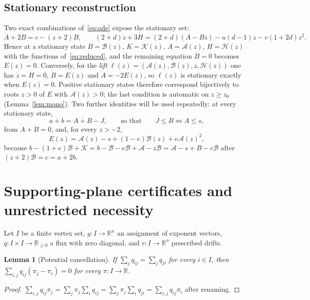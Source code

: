 \documentclass[11pt,a4paper]{article}
\theoremstyle{plain}
\newtheorem{lemma}[theorem]{Lemma}
\theoremstyle{definition}
\theoremstyle{remark}
\newcommand{\R}{\mathbb{R}}
\newcommand{\rA}{\mathcal{A}}
\newcommand{\rB}{\mathcal{B}}
\newcommand{\rK}{\mathcal{K}}
\newcommand{\rH}{\mathcal{H}}
\begin{document}
\subsection{Stationary reconstruction}

Two exact combinations of~\eqref{eq:ode} expose the stationary set:
\begin{equation}\label{eq:combinations}
\dot A+2\dot B=c-(z+2)B,\qquad
(2+d)\dot z+3\dot H=(2+d)(A-Bz)-u(d-1)z-v(1+2d)z^2.
\end{equation}
Hence at a stationary state $B=\rB(z)$, $K=\rK(z)$, $A=\rA(z)$, $H=\rH(z)$ with the functions of~\eqref{eq:reduced}, and the remaining equation $\dot B=0$ becomes $E(z)=0$. Conversely, for the \emph{lift} $\ell(z)=(\rA(z),\rB(z),z,\rH(z))$ one has $\dot z=\dot H=0$, $\dot B=E(z)$ and $\dot A=-2E(z)$, so $\ell(z)$ is stationary exactly when $E(z)=0$. Positive stationary states therefore correspond bijectively to roots $z>0$ of $E$ with $\rA(z)>0$; the last condition is automatic on $z\ge z_0$ (Lemma~\ref{lem:mono}). Two further identities will be used repeatedly: at every stationary state,
\begin{equation}\label{eq:reservoir}
a+b=A+B-J,\qquad\text{so that}\qquad J\le B\iff A\le s,
\end{equation}
from $\dot A+\dot B=0$, and, for every $z>-2$,
\begin{equation}\label{eq:port}
E(z)=\rA(z)-s+(1-e)\rB(z)+e\rA(z)^2,
\end{equation}
because $b-(1+e)\rB+\rK=b-\rB-e\rB+\rA-z\rB=\rA-s+B-e\rB$ after $(z+2)\rB=c=a+2b$.

\section{Supporting-plane certificates and unrestricted necessity}\label{sec:dual}

Let $I$ be a finite vertex set, $y:I\to\R^n$ an assignment of exponent vectors, $q:I\times I\to\R_{\ge0}$ a flux with zero diagonal, and $r:I\to\R^n$ prescribed drifts.

\begin{lemma}[Potential cancellation]\label{lem:circulation}
If $\sum_jq_{ij}=\sum_jq_{ji}$ for every $i\in I$, then $\sum_{i,j}q_{ij}(\pi_j-\pi_i)=0$ for every $\pi:I\to\R$.
\end{lemma}
\begin{proof}
$\sum_{i,j}q_{ij}\pi_j=\sum_j\pi_j\sum_iq_{ij}=\sum_j\pi_j\sum_iq_{ji}=\sum_{i,j}q_{ij}\pi_i$ after renaming.
\end{proof}
\end{document}
